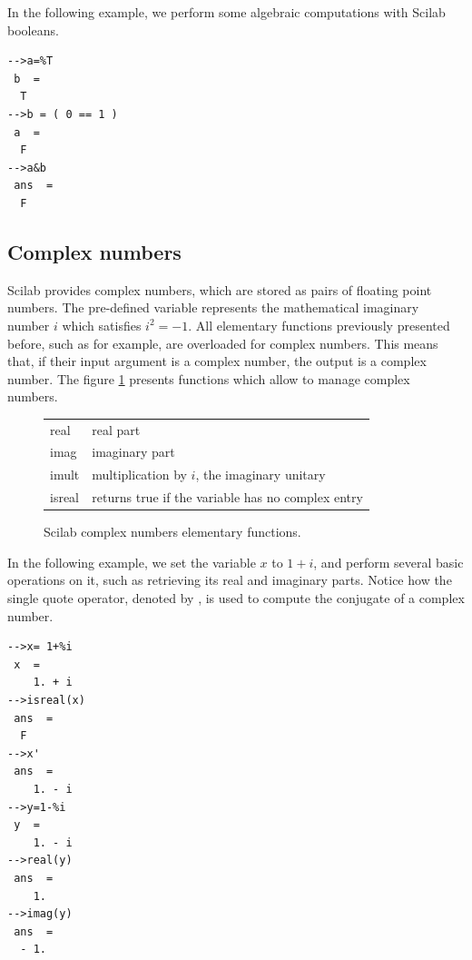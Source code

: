 In the following example, we perform some algebraic computations 
with Scilab booleans.

\lstset{language=scilabscript}
\begin{lstlisting}
-->a=%T
 b  =
  T  
-->b = ( 0 == 1 )
 a  =
  F  
-->a&b
 ans  =
  F  
\end{lstlisting}

\subsection{Complex numbers}
\label{introscilab-complexnumber}

Scilab provides complex numbers, which are stored 
as pairs of floating point numbers. 
The pre-defined variable  represents the mathematical imaginary
number $i$ which satisfies $i^2=-1$.
All elementary functions previously presented before, such as  for example, 
are overloaded for complex numbers. This means that, if their input 
argument is a complex number, the output is a complex 
number. The figure \ref{fig-introscilab-complexelemfun} presents  
functions which allow to manage complex numbers.

\begin{figure}
\begin{center}
\begin{tabular}{|ll|}
\hline
real & real part \\
imag & imaginary part \\
imult & multiplication by $i$, the imaginary unitary \\
isreal & returns true if the variable has no complex entry \\
\hline
\end{tabular}
\end{center}
\caption{Scilab complex numbers elementary functions.}
\label{fig-introscilab-complexelemfun}
\end{figure}

In the following example, we set the variable $x$ to $1+i$,
and perform several basic operations on it, such as retrieving 
its real and imaginary parts. Notice how the single quote operator, 
denoted by \scisinglequote{},  is used to compute the conjugate of a complex number.
\lstset{language=scilabscript}
\begin{lstlisting}
-->x= 1+%i
 x  =
    1. + i    
-->isreal(x)
 ans  =
  F  
-->x'
 ans  =
    1. - i    
-->y=1-%i
 y  =
    1. - i    
-->real(y)
 ans  =
    1.  
-->imag(y)
 ans  =
  - 1.  
\end{lstlisting}

